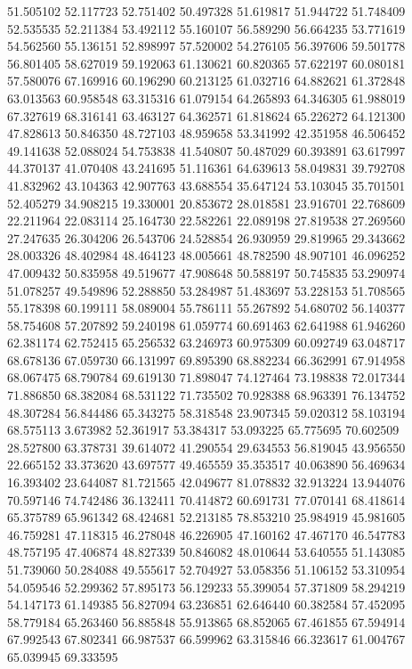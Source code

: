 51.505102
52.117723
52.751402
50.497328
51.619817
51.944722
51.748409
52.535535
52.211384
53.492112
55.160107
56.589290
56.664235
53.771619
54.562560
55.136151
52.898997
57.520002
54.276105
56.397606
59.501778
56.801405
58.627019
59.192063
61.130621
60.820365
57.622197
60.080181
57.580076
67.169916
60.196290
60.213125
61.032716
64.882621
61.372848
63.013563
60.958548
63.315316
61.079154
64.265893
64.346305
61.988019
67.327619
68.316141
63.463127
64.362571
61.818624
65.226272
64.121300
47.828613
50.846350
48.727103
48.959658
53.341992
42.351958
46.506452
49.141638
52.088024
54.753838
41.540807
50.487029
60.393891
63.617997
44.370137
41.070408
43.241695
51.116361
64.639613
58.049831
39.792708
41.832962
43.104363
42.907763
43.688554
35.647124
53.103045
35.701501
52.405279
34.908215
19.330001
20.853672
28.018581
23.916701
22.768609
22.211964
22.083114
25.164730
22.582261
22.089198
27.819538
27.269560
27.247635
26.304206
26.543706
24.528854
26.930959
29.819965
29.343662
28.003326
48.402984
48.464123
48.005661
48.782590
48.907101
46.096252
47.009432
50.835958
49.519677
47.908648
50.588197
50.745835
53.290974
51.078257
49.549896
52.288850
53.284987
51.483697
53.228153
51.708565
55.178398
60.199111
58.089004
55.786111
55.267892
54.680702
56.140377
58.754608
57.207892
59.240198
61.059774
60.691463
62.641988
61.946260
62.381174
62.752415
65.256532
63.246973
60.975309
60.092749
63.048717
68.678136
67.059730
66.131997
69.895390
68.882234
66.362991
67.914958
68.067475
68.790784
69.619130
71.898047
74.127464
73.198838
72.017344
71.886850
68.382084
68.531122
71.735502
70.928388
68.963391
76.134752
48.307284
56.844486
65.343275
58.318548
23.907345
59.020312
58.103194
68.575113
3.673982
52.361917
53.384317
53.093225
65.775695
70.602509
28.527800
63.378731
39.614072
41.290554
29.634553
56.819045
43.956550
22.665152
33.373620
43.697577
49.465559
35.353517
40.063890
56.469634
16.393402
23.644087
81.721565
42.049677
81.078832
32.913224
13.944076
70.597146
74.742486
36.132411
70.414872
60.691731
77.070141
68.418614
65.375789
65.961342
68.424681
52.213185
78.853210
25.984919
45.981605
46.759281
47.118315
46.278048
46.226905
47.160162
47.467170
46.547783
48.757195
47.406874
48.827339
50.846082
48.010644
53.640555
51.143085
51.739060
50.284088
49.555617
52.704927
53.058356
51.106152
53.310954
54.059546
52.299362
57.895173
56.129233
55.399054
57.371809
58.294219
54.147173
61.149385
56.827094
63.236851
62.646440
60.382584
57.452095
58.779184
65.263460
56.885848
55.913865
68.852065
67.461855
67.594914
67.992543
67.802341
66.987537
66.599962
63.315846
66.323617
61.004767
65.039945
69.333595
